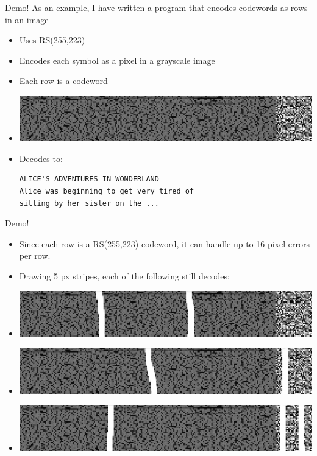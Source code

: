 \documentclass[]{prosper}
\begin{document}
\begin{slide}{Demo!}
As an example, I have written a program that encodes codewords as rows in an image
\begin{itemize}
    \item Uses RS(255,223)
    \item Encodes each symbol as a pixel in a grayscale image
    \item Each row is a codeword
    \item
    \includegraphics{encodedimage}
    \item Decodes to:
\begin{verbatim}
ALICE'S ADVENTURES IN WONDERLAND
Alice was beginning to get very tired of
sitting by her sister on the ...
\end{verbatim}
\end{itemize}
\end{slide}

\begin{slide}{Demo!}
\begin{itemize}
    \item Since each row is a RS(255,223) codeword, it can handle up to 16 pixel errors per row.
    \item Drawing 5 px stripes, each of the following still decodes:
    \item \includegraphics{encodedimage_stripes1}
    \item \includegraphics{encodedimage_stripes2}
    \item \includegraphics{encodedimage_stripes3}
\end{itemize}
\end{slide}
\end{document}
